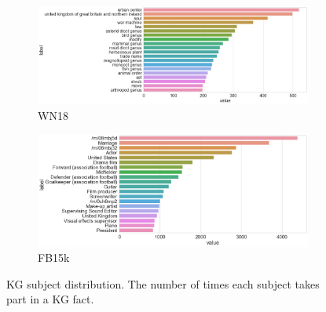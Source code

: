 \begin{figure}[H]
	\begin{subfigure}[b]{.5\linewidth}
   		\centering
    		\includegraphics[width=1.0\linewidth, height=0.7\linewidth]{WN18_Subject_Counts}
		\captionsetup{justification=centering}
		\caption{WN18}
	\end{subfigure}
	\begin{subfigure}[b]{.5\linewidth}
   		\centering
		\includegraphics[width=1.0\linewidth, height=0.7\linewidth]{FB15k_Subject_Counts}
		\captionsetup{justification=centering}
		\caption{FB15k}
	\end{subfigure}
	\captionsetup{justification=centering}
	\caption{KG subject distribution. The number of times each subject takes part in a KG fact.}
\end{figure}

